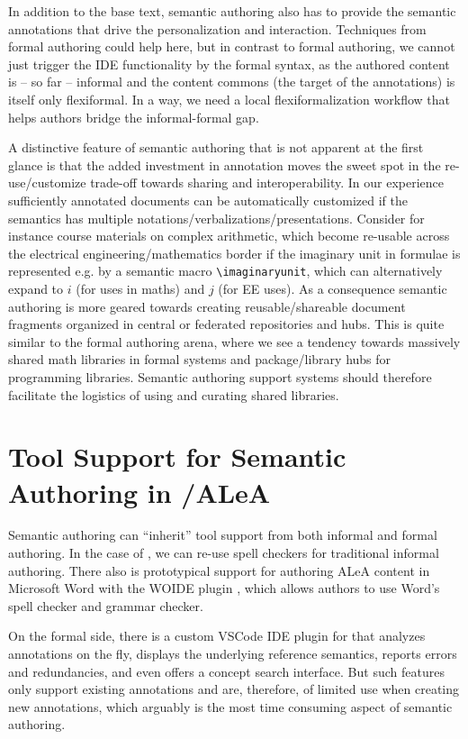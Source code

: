 \documentclass[runningheads]{llncs}
\newcommand\ALeA{\textsf{ALeA}\xspace}
\newcommand\WOIDE{\textsf{WOIDE}\xspace}
\begin{document}
In addition to the base text, semantic authoring also has to provide the semantic
annotations that drive the personalization and interaction. Techniques from formal
authoring could help here, but in contrast to formal authoring, we cannot just trigger the
IDE functionality by the formal syntax, as the authored content is -- so far -- informal
and the content commons (the target of the annotations) is itself only flexiformal. In a
way, we need a local flexiformalization workflow that helps authors bridge the
informal-formal gap.

A distinctive feature of semantic authoring that is not apparent at the first glance is
that the added investment in annotation moves the sweet spot in the re-use/customize
trade-off towards sharing and interoperability. In our experience sufficiently annotated
documents can be automatically customized if the semantics has multiple
notations/verbalizations/presentations. Consider for instance course materials on complex
arithmetic, which become re-usable across the electrical engineering/mathematics border if
the imaginary unit in formulae is represented e.g. by a semantic macro
\lstinline|\imaginaryunit|, which can alternatively expand to $i$ (for uses in maths) and
$j$ (for EE uses). As a consequence semantic authoring is more geared towards creating
reusable/shareable document fragments organized in central or federated repositories and
hubs. This is quite similar to the formal authoring arena, where we see a tendency towards
massively shared math libraries in formal systems and package/library hubs for programming
libraries. Semantic authoring support systems should therefore facilitate the
logistics of using and curating shared libraries.

\section{Tool Support for Semantic Authoring in \sTeX/\ALeA}\label{sec:tools}

Semantic authoring can ``inherit'' tool support from both informal and formal authoring.
In the case of \sTeX, we can re-use spell checkers for traditional informal authoring.
There also is prototypical support for authoring \ALeA content in Microsoft Word with
the \WOIDE plugin \cite{KohKoh:woide24}, which allows authors to use Word's spell
checker and grammar checker.

On the formal side, there is a custom VSCode IDE plugin for \sTeX \cite{sTeX-IDE:git} that
analyzes annotations on the fly, displays the underlying reference semantics, reports
errors and redundancies, and even offers a concept search interface.  But such features
only support existing annotations and are, therefore, of limited use when creating new
annotations, which arguably is the most time consuming aspect of semantic authoring.
\end{document}
